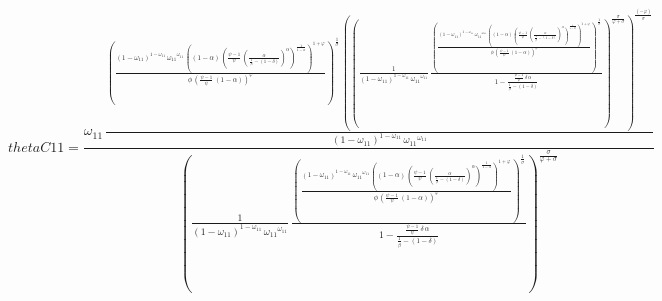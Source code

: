 \begin{dmath*}
thetaC11 = \frac{{{\omega_{11}}}\, \frac{\left(\frac{\left(1-{{\omega_{11}}}\right)^{1-{{\omega_{11}}}}\, {{\omega_{11}}}^{{{\omega_{11}}}}\, \left(\left(1-{{\alpha}}\right)\, \left(\frac{{{\psi}}-1}{{{\psi}}}\, \left(\frac{{{\alpha}}}{\frac{1}{{{\beta}}}-\left(1-{{\delta}}\right)}\right)^{{{\alpha}}}\right)^{\frac{1}{1-{{\alpha}}}}\right)^{1+{{\varphi}}}}{{{\phi}}\, \left(\frac{{{\psi}}-1}{{{\psi}}}\, \left(1-{{\alpha}}\right)\right)^{{{\varphi}}}}\right)^{\frac{1}{{{\sigma}}}}\, \left(\left(\frac{1}{\left(1-{{\omega_{11}}}\right)^{1-{{\omega_{11}}}}\, {{\omega_{11}}}^{{{\omega_{11}}}}}\, \frac{\left(\frac{\left(1-{{\omega_{11}}}\right)^{1-{{\omega_{11}}}}\, {{\omega_{11}}}^{{{\omega_{11}}}}\, \left(\left(1-{{\alpha}}\right)\, \left(\frac{{{\psi}}-1}{{{\psi}}}\, \left(\frac{{{\alpha}}}{\frac{1}{{{\beta}}}-\left(1-{{\delta}}\right)}\right)^{{{\alpha}}}\right)^{\frac{1}{1-{{\alpha}}}}\right)^{1+{{\varphi}}}}{{{\phi}}\, \left(\frac{{{\psi}}-1}{{{\psi}}}\, \left(1-{{\alpha}}\right)\right)^{{{\varphi}}}}\right)^{\frac{1}{{{\sigma}}}}}{1-\frac{\frac{{{\psi}}-1}{{{\psi}}}\, {{\delta}}\, {{\alpha}}}{\frac{1}{{{\beta}}}-\left(1-{{\delta}}\right)}}\right)^{\frac{{{\sigma}}}{{{\varphi}}+{{\sigma}}}}\right)^{\frac{\left(-{{\varphi}}\right)}{{{\sigma}}}}}{\left(1-{{\omega_{11}}}\right)^{1-{{\omega_{11}}}}\, {{\omega_{11}}}^{{{\omega_{11}}}}}}{\left(\frac{1}{\left(1-{{\omega_{11}}}\right)^{1-{{\omega_{11}}}}\, {{\omega_{11}}}^{{{\omega_{11}}}}}\, \frac{\left(\frac{\left(1-{{\omega_{11}}}\right)^{1-{{\omega_{11}}}}\, {{\omega_{11}}}^{{{\omega_{11}}}}\, \left(\left(1-{{\alpha}}\right)\, \left(\frac{{{\psi}}-1}{{{\psi}}}\, \left(\frac{{{\alpha}}}{\frac{1}{{{\beta}}}-\left(1-{{\delta}}\right)}\right)^{{{\alpha}}}\right)^{\frac{1}{1-{{\alpha}}}}\right)^{1+{{\varphi}}}}{{{\phi}}\, \left(\frac{{{\psi}}-1}{{{\psi}}}\, \left(1-{{\alpha}}\right)\right)^{{{\varphi}}}}\right)^{\frac{1}{{{\sigma}}}}}{1-\frac{\frac{{{\psi}}-1}{{{\psi}}}\, {{\delta}}\, {{\alpha}}}{\frac{1}{{{\beta}}}-\left(1-{{\delta}}\right)}}\right)^{\frac{{{\sigma}}}{{{\varphi}}+{{\sigma}}}}}
\end{dmath*}
